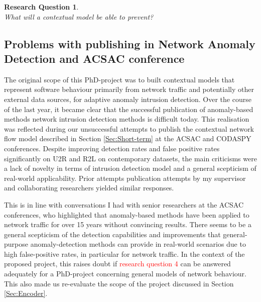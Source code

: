 \documentclass[a4paper,12pt,twoside]{article}
\newtheorem{rquestion}{Research Question}
\begin{document}
\begin{rquestion}\ \\
What will a contextual model be able to prevent? 
\end{rquestion}



\subsection{Problems with publishing in Network Anomaly Detection and ACSAC conference}\label{Sec:Problems}

The original scope of this PhD-project was to built contextual models that represent software behaviour primarily from network traffic and potentially other external data sources, for adaptive anomaly intrusion detection.  
Over the course of the last year, it became clear that the successful publication of anomaly-based methods network intrusion detection methods is difficult today. This realisation was reflected during our unsuccessful attempts to publish the contextual network flow model described in Section \ref{Sec:Short-term} at the ACSAC and CODASPY conferences. Despite improving detection rates and false positive rates significantly on U2R and R2L on contemporary datasets, the main criticisms were a lack of novelty in terms of intrusion detection model and a general scepticism of real-world applicability. Prior attempts publication attempts by my supervisor and collaborating researchers yielded similar responses.

This is in line with conversations I had with senior researchers at the ACSAC conferences, who highlighted that anomaly-based methods have been applied to network traffic for over 15 years without convincing results. There seems to be a general scepticism of the detection capabilities and improvements that general-purpose anomaly-detection methods can provide in real-world scenarios due to high false-positive rates, in particular for network traffic. In the context of the proposed project, this raises doubt if \textcolor{red}{research question 4} can be answered adequately for a PhD-project concerning general models of network behaviour. This also made us re-evaluate the scope of the project discussed in Section \ref{Sec:Encoder}.
\end{document}
